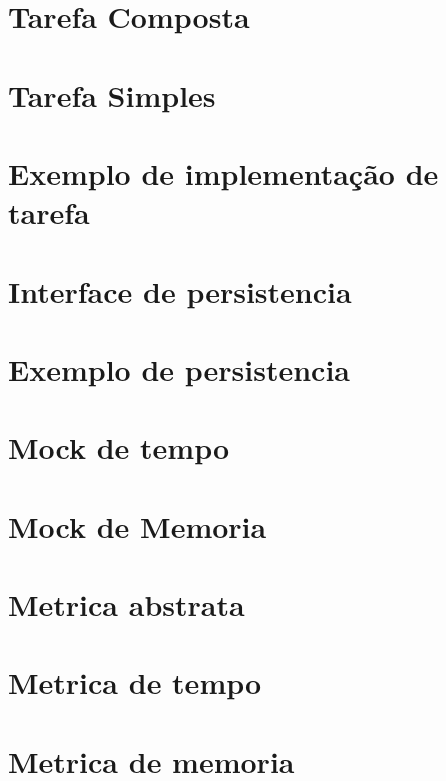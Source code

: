 \documentclass[12pt]{tcc}
\begin{document}
\section{Tarefa Composta}


\section{Tarefa Simples}


\section{Exemplo de implementação de tarefa}


\section{Interface de persistencia}


\section{Exemplo de persistencia}


\section{Mock de tempo}


\section{Mock de Memoria}


\section{Metrica abstrata}


\section{Metrica de tempo}


\section{Metrica de memoria}

\end{document}
